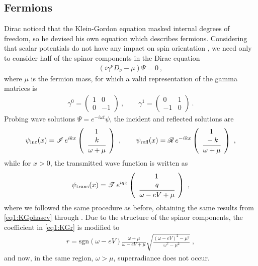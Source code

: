 \subsection{Fermions}

Dirac noticed that the Klein-Gordon equation masked internal degrees of freedom, so he devised his own equation which describes fermions.
Considering that scalar potentials do not have any impact on spin orientation \cite{Itzykson2012}, we need only to consider half of the spinor components in the Dirac equation
\begin{align}
    ( i \gamma^\nu D_\nu - \mu ) \Psi = 0 ~,
    \label{eq1:Dirac}
\end{align}
where $\mu$ is the fermion mass, for which a valid representation of the gamma matrices is
\begin{align}
    \gamma^0 = \left(\begin{array}{cr} 1 & 0 \\  0 & -1 \end{array}\right) ~,\qquad 
    \gamma^1 = \left(\begin{array}{cr} 0 & 1 \\ -1 &  0 \end{array}\right) ~.
    \label{eq1:Gamma1+1}
\end{align}
Probing wave solutions $\Psi= e^{-i\omega t} \psi$, the incident and reflected solutions are
\begin{align}
    \psi_\mathrm{inc}(x) = \mathscr{I}\, e^{i k x} \left(\begin{array}{c} 1 \\ \cfrac{k}{\omega+\mu} \end{array}\right) ~,\qquad
    \psi_\mathrm{refl}(x) = \mathscr{R}\, e^{- i k x} \left(\begin{array}{c} 1 \\ \cfrac{-k}{\omega+\mu} \end{array}\right) ~,
    \label{eq1:Diracsolneg}   
\end{align}
while for $x>0$, the transmitted wave function is written as 
\begin{align}
    \psi_\mathrm{trans}(x) = \mathscr{T}\, e^{i q x} \left(\begin{array}{c} 1 \\ \cfrac{q}{ \omega - e V + \mu} \end{array}\right) ~,
    \label{eq1:Diracsolpos} 
\end{align}
where we followed the same procedure as before, obtaining the same results from \eqref{eq1:KGphasev} through . 
Due to the structure of the spinor components, the coefficient in \eqref{eq1:KGr} is modified to
\begin{align}
    r = \mathrm{sgn}(\omega - e V) \frac{\omega+\mu}{\omega-e V+\mu} \sqrt{\frac{(\omega - e V)^2 - \mu^2}{\omega^2 - \mu^2}} ~,
    \label{eq1:Diracr} 
\end{align}
and now, in the same region, $\omega > \mu$, superradiance does not occur.

